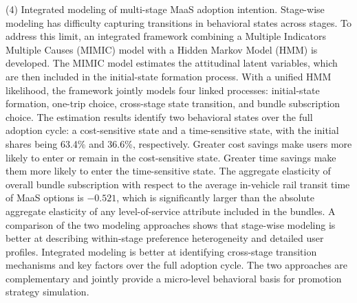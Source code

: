 \begin{englishabstract}
(4) Integrated modeling of multi-stage MaaS adoption intention. Stage-wise modeling has difficulty capturing transitions in behavioral states across stages. To address this limit, an integrated framework combining a Multiple Indicators Multiple Causes (MIMIC) model with a Hidden Markov Model (HMM) is developed. The MIMIC model estimates the attitudinal latent variables, which are then included in the initial-state formation process. With a unified HMM likelihood, the framework jointly models four linked processes: initial-state formation, one-trip choice, cross-stage state transition, and bundle subscription choice. The estimation results identify two behavioral states over the full adoption cycle: a cost-sensitive state and a time-sensitive state, with the initial shares being 63.4\% and 36.6\%, respectively. Greater cost savings make users more likely to enter or remain in the cost-sensitive state. Greater time savings make them more likely to enter the time-sensitive state. The aggregate elasticity of overall bundle subscription with respect to the average in-vehicle rail transit time of MaaS options is $-0.521$, which is significantly larger than the absolute aggregate elasticity of any level-of-service attribute included in the bundles. A comparison of the two modeling approaches shows that stage-wise modeling is better at describing within-stage preference heterogeneity and detailed user profiles. Integrated modeling is better at identifying cross-stage transition mechanisms and key factors over the full adoption cycle. The two approaches are complementary and jointly provide a micro-level behavioral basis for promotion strategy simulation.


\end{englishabstract}
